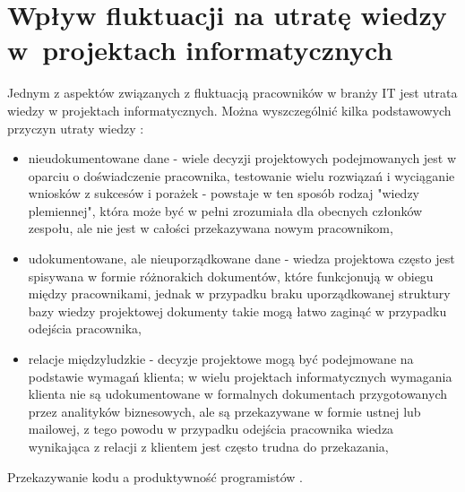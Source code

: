 \begin{minipage}{\textwidth}
\begin{table}[H]
\begin{center}
\begin{tabular}{|P{.2\textwidth}|P{.7\textwidth}|}
                         \hline

                     \end{tabular}
                 \end{center}
                 \raggedright{}
                 \vspace{0.75cm}
             \end{table}
\end{minipage}
%
%
%
%
%



\section{Wpływ fluktuacji na utratę wiedzy w~projektach informatycznych}\label{sec:it-knowledge-loss}

Jednym z aspektów związanych z fluktuacją pracowników w branży IT jest utrata wiedzy w projektach informatycznych.
Można wyszczególnić kilka podstawowych przyczyn utraty wiedzy \cite{https://hellonesh.io/employee-turnover-knowledge-loss-lets-change-the-equation/}:
\begin{itemize}
    \item nieudokumentowane dane - wiele decyzji projektowych podejmowanych jest w oparciu o doświadczenie pracownika, testowanie wielu rozwiązań i wyciąganie wniosków z sukcesów i porażek - powstaje w ten sposób rodzaj "wiedzy plemiennej", która może być w pełni zrozumiała dla obecnych członków zespołu, ale nie jest w całości przekazywana nowym pracownikom,
    \item udokumentowane, ale nieuporządkowane dane - wiedza projektowa często jest spisywana w formie różnorakich dokumentów, które funkcjonują w obiegu między pracownikami, jednak w przypadku braku uporządkowanej struktury bazy wiedzy projektowej dokumenty takie mogą łatwo zaginąć w przypadku odejścia pracownika,
    \item relacje międzyludzkie - decyzje projektowe mogą być podejmowane na podstawie wymagań klienta; w wielu projektach informatycznych wymagania klienta nie są udokumentowane w formalnych dokumentach przygotowanych przez analityków biznesowych, ale są przekazywane w formie ustnej lub mailowej, z tego powodu w przypadku odejścia pracownika wiedza wynikająca z relacji z klientem jest często trudna do przekazania,
    \end{itemize}
Przekazywanie kodu a produktywność programistów \cite{mockus-2009}.

